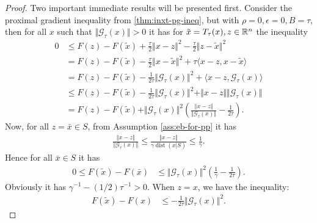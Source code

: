\documentclass[12pt]{article}
\DeclareMathOperator{\dist}{\mathop{dist}}
\begin{document}
        \begin{proof}
            Two important immediate results will be presented first.
            Consider the proximal gradient inequality from \ref{thm:inxt-pg-ineq}, but with $\rho = 0, \epsilon = 0, B = \tau$, then for all $x$ such that $\Vert \mathcal G_\tau(x)\Vert > 0$ it has for $\tilde x = T_{\tau}(x), z \in \mathbb R^n$ the inequality 
            \begin{align*}
                0 &\le 
                F(z) - F(\tilde x) + \frac{\tau}{2}\Vert x - z\Vert^2 - \frac{\tau}{2}\Vert z - \tilde x\Vert^2
                \\
                &=  
                F(z) - F(\tilde x) - \frac{\tau}{2}\Vert x - \tilde x\Vert^2
                + \tau\langle x - z, x - \tilde x\rangle
                \\
                &= F(z) - F(\tilde x) - \frac{1}{2\tau}\Vert \mathcal G_\tau(x) \Vert^2
                + \langle x - z, \mathcal G_\tau(x)\rangle
                \\
                &\le F(z) - F(\tilde x) - \frac{1}{2\tau}\Vert \mathcal G_\tau(x)\Vert^2 
                + \Vert x - z\Vert \Vert \mathcal G_\tau(x)\Vert
                \\
                &= 
                F(z) - F(\tilde x) 
                + \Vert \mathcal G_\tau(x)\Vert^2\left(
                    \frac{\Vert x - z \Vert}{\Vert \mathcal G_\tau(x)\Vert} - \frac{1}{2\tau}
                \right). 
            \end{align*}
            Now, for all $z = \bar x \in S$, from Assumption \ref{ass:eb-for-pp} it has
            \begin{align*}
                \frac{\Vert x - z \Vert}{\Vert \mathcal G_\tau(x)\Vert}
                \le 
                \frac{\Vert x - z \Vert}{\gamma \dist(x | S)} \le \frac{1}{\gamma}. 
            \end{align*}
            Hence for all $\bar x \in S$ it has 
            \begin{align}\label{ineq:lin-cnvg-ista-eb-pitem1}
                0\le F(\tilde x) - F(\bar x)&\le 
                \Vert \mathcal G_\tau(x)\Vert^2\left(
                    \frac{1}{\gamma} - \frac{1}{2\tau}
                \right). 
            \end{align}
            Obviously it has $\gamma^{-1} - (1/2)\tau^{-1} > 0$. 
            When $z = x$, we have the inequality: 
            \begin{align}\label{ineq:lin-cnvg-ista-eb-pitem2}
                F(\tilde x) - F(x) &\le - \frac{1}{2\tau}\Vert \mathcal G_\tau(x)\Vert^2. 

\end{align}
\end{proof}
\end{document}
